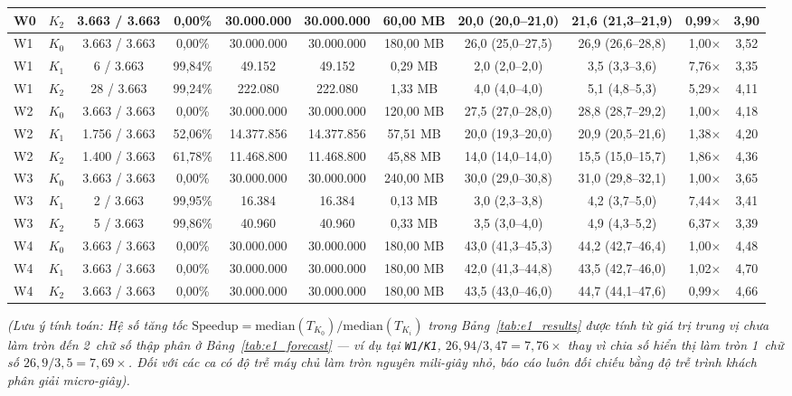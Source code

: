 \documentclass[13pt,a4paper]{report}
\begin{document}
\begin{table}[!htb]
{\begin{tabular}{llcccccccrc}
W0 & $K_2$ & 3.663 / 3.663 & 0,00\% & 30.000.000 & 30.000.000 & 60,00 MB & 20,0 (20,0--21,0) & 21,6 (21,3--21,9) & 0,99${\times}$ & 3,90 \\
\midrule
W1 & $K_0$ & 3.663 / 3.663 & 0,00\% & 30.000.000 & 30.000.000 & 180,00 MB & 26,0 (25,0--27,5) & 26,9 (26,6--28,8) & 1,00${\times}$ & 3,52 \\
W1 & $K_1$ & 6 / 3.663 & 99,84\% & 49.152 & 49.152 & 0,29 MB & 2,0 (2,0--2,0) & 3,5 (3,3--3,6) & 7,76${\times}$ & 3,35 \\
W1 & $K_2$ & 28 / 3.663 & 99,24\% & 222.080 & 222.080 & 1,33 MB & 4,0 (4,0--4,0) & 5,1 (4,8--5,3) & 5,29${\times}$ & 4,11 \\
\midrule
W2 & $K_0$ & 3.663 / 3.663 & 0,00\% & 30.000.000 & 30.000.000 & 120,00 MB & 27,5 (27,0--28,0) & 28,8 (28,7--29,2) & 1,00${\times}$ & 4,18 \\
W2 & $K_1$ & 1.756 / 3.663 & 52,06\% & 14.377.856 & 14.377.856 & 57,51 MB & 20,0 (19,3--20,0) & 20,9 (20,5--21,6) & 1,38${\times}$ & 4,20 \\
W2 & $K_2$ & 1.400 / 3.663 & 61,78\% & 11.468.800 & 11.468.800 & 45,88 MB & 14,0 (14,0--14,0) & 15,5 (15,0--15,7) & 1,86${\times}$ & 4,36 \\
\midrule
W3 & $K_0$ & 3.663 / 3.663 & 0,00\% & 30.000.000 & 30.000.000 & 240,00 MB & 30,0 (29,0--30,8) & 31,0 (29,8--32,1) & 1,00${\times}$ & 3,65 \\
W3 & $K_1$ & 2 / 3.663 & 99,95\% & 16.384 & 16.384 & 0,13 MB & 3,0 (2,3--3,8) & 4,2 (3,7--5,0) & 7,44${\times}$ & 3,41 \\
W3 & $K_2$ & 5 / 3.663 & 99,86\% & 40.960 & 40.960 & 0,33 MB & 3,5 (3,0--4,0) & 4,9 (4,3--5,2) & 6,37${\times}$ & 3,39 \\
\midrule
W4 & $K_0$ & 3.663 / 3.663 & 0,00\% & 30.000.000 & 30.000.000 & 180,00 MB & 43,0 (41,3--45,3) & 44,2 (42,7--46,4) & 1,00${\times}$ & 4,48 \\
W4 & $K_1$ & 3.663 / 3.663 & 0,00\% & 30.000.000 & 30.000.000 & 180,00 MB & 42,0 (41,3--44,8) & 43,5 (42,7--46,0) & 1,02${\times}$ & 4,70 \\
W4 & $K_2$ & 3.663 / 3.663 & 0,00\% & 30.000.000 & 30.000.000 & 180,00 MB & 43,5 (43,0--46,0) & 44,7 (44,1--47,6) & 0,99${\times}$ & 4,66 \\
\bottomrule
\end{tabular}%
}
\end{table}

\noindent\textit{(Lưu ý tính toán: Hệ số tăng tốc $\text{Speedup} = \text{median}(T_{K_0}) / \text{median}(T_{K_i})$ trong Bảng~\ref{tab:e1_results} được tính từ giá trị trung vị chưa làm tròn đến 2~chữ số thập phân ở Bảng~\ref{tab:e1_forecast} --- ví dụ tại \texttt{W1/\allowbreak{}K1}, $26{,}94 / 3{,}47 = 7{,}76{\times}$ thay vì chia số hiển thị làm tròn 1~chữ số $26{,}9 / 3{,}5 = 7{,}69{\times}$. Đối với các ca có độ trễ máy chủ làm tròn nguyên mili-giây nhỏ, báo cáo luôn đối chiếu bằng độ trễ trình khách phân giải micro-giây).}
\end{document}
